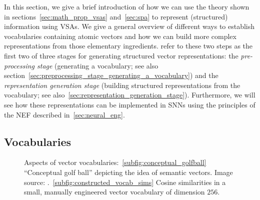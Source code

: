 In this section, we give a brief introduction of how we can use the theory shown in sections~\ref{sec:math_prop_vsas} and~\ref{sec:spa} to represent (structured) information using \acp{VSA}.
We give a general overview of different ways to establish vocabularies containing atomic vectors and how we can build more complex representations from those elementary ingredients.
\textcite{Gallant2013} refer to these two steps as the first two of three stages for generating structured vector representations: the \emph{pre-processing stage} (generating a vocabulary; see also section~\ref{sec:preprocessing_stage_generating_a_vocabulary}) and the \emph{representation generation stage} (building structured representations from the vocabulary; see also~\ref{sec:representation_generation_stage}).
Furthermore, we will see how these representations can be implemented in \acp{SNN} using the principles of the \ac{NEF} described in~\ref{sec:neural_eng}.

\subsection{Vocabularies}
\label{subsec:vocabs}

\begin{figure}[t!]
	\centering
	\caption{Aspects of vector vocabularies:~\ref{subfig:conceptual_golfball} \enquote{Conceptual golf ball} depicting the idea of semantic vectors. Image source: \textcite{Eliasmith2013}.~\ref{subfig:constructed_vocab_sims} Cosine similarities in a small, manually engineered vector vocabulary of dimension $256$.}
    \label{fig:vector vocabs}
\end{figure}

